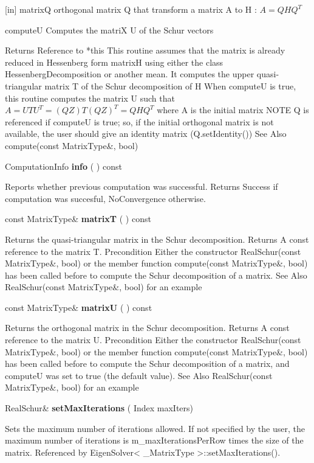 [in] matrixQ orthogonal matrix Q that transform a matrix A to H : $A = Q H Q^T$  

computeU Computes the matriX U of the Schur vectors  

Returns
Reference to *this 
This routine assumes that the matrix is already reduced in Hessenberg form matrixH using either the class HessenbergDecomposition or another mean. It computes the upper quasi-triangular matrix T of the Schur decomposition of H When computeU is true, this routine computes the matrix U such that $A = U T U^T = (QZ) T (QZ)^T = Q H Q^T$ where A is the initial matrix
NOTE Q is referenced if computeU is true; so, if the initial orthogonal matrix is not available, the user should give an identity matrix (Q.setIdentity())
See Also
compute(const MatrixType\&, bool) 


\vspace{0.3cm}
ComputationInfo \textbf{info}  ( )  const 

Reports whether previous computation was successful. 
Returns
Success if computation was succesful, NoConvergence otherwise. 


\vspace{0.3cm}
const MatrixType\& \textbf{matrixT}  ( )  const 

Returns the quasi-triangular matrix in the Schur decomposition. 
Returns
A const reference to the matrix T.
Precondition
Either the constructor RealSchur(const MatrixType\&, bool) or the member function compute(const MatrixType\&, bool) has been called before to compute the Schur decomposition of a matrix.
See Also
RealSchur(const MatrixType\&, bool) for an example 


\vspace{0.3cm}
const MatrixType\& \textbf{matrixU}  ( )  const 

Returns the orthogonal matrix in the Schur decomposition. 
Returns
A const reference to the matrix U.
Precondition
Either the constructor RealSchur(const MatrixType\&, bool) or the member function compute(const MatrixType\&, bool) has been called before to compute the Schur decomposition of a matrix, and computeU was set to true (the default value).
See Also
RealSchur(const MatrixType\&, bool) for an example 


\vspace{0.3cm}
RealSchur\& \textbf{setMaxIterations}  ( Index  maxIters)   

Sets the maximum number of iterations allowed. 
If not specified by the user, the maximum number of iterations is m\_maxIterationsPerRow times the size of the matrix. 
Referenced by EigenSolver< \_MatrixType >::setMaxIterations().


